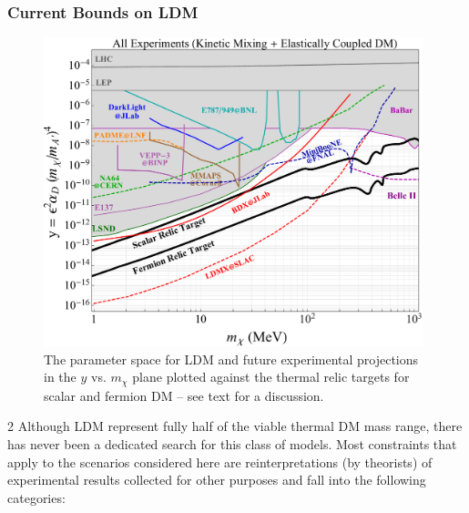 \subsubsection{Current Bounds on LDM}


\begin{figure}[t!]
\center
\includegraphics[width=11cm]{images/goals/everything.pdf}
\caption{ The parameter space for LDM and future experimental projections in the $y$ vs. $m_\chi$ plane plotted against
 the thermal relic targets for scalar and fermion DM -- see text for a discussion. }
\label{fig:mainplot}
\end{figure}

2
Although LDM represent fully half of the viable thermal DM mass range, there has never been a dedicated search
for this class of models. Most constraints that apply to the scenarios considered here are reinterpretations (by theorists)
of experimental results collected for other purposes and fall into the following categories:

